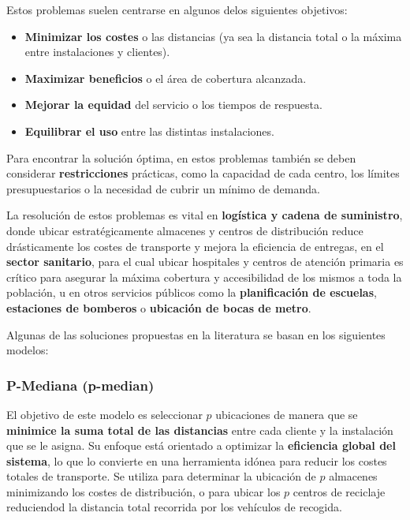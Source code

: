 \documentclass[12pt,a4paper]{book}
\begin{document}
Estos problemas suelen centrarse en algunos  delos siguientes objetivos:
\begin{itemize}
    \item \textbf{Minimizar los costes} o las distancias (ya sea la distancia total o la máxima entre instalaciones y clientes).
    \item \textbf{Maximizar beneficios} o el área de cobertura alcanzada.
    \item \textbf{Mejorar la equidad} del servicio o los tiempos de respuesta.
    \item \textbf{Equilibrar el uso} entre las distintas instalaciones.
\end{itemize}

Para encontrar la solución óptima, en estos problemas también se deben considerar \textbf{restricciones} prácticas, como la capacidad de cada centro, los límites presupuestarios o la necesidad de cubrir un mínimo de demanda.

La resolución de estos problemas es vital en \textbf{logística y cadena de suministro}, donde ubicar estratégicamente almacenes y centros
de distribución reduce drásticamente los costes de transporte y mejora la eficiencia de entregas, en el \textbf{sector sanitario}, para el cual ubicar hospitales y centros de atención primaria es crítico para
asegurar la máxima cobertura y accesibilidad de los mismos a toda la población, u en otros servicios públicos como la \textbf{planificación de escuelas}, \textbf{estaciones de bomberos} o \textbf{ubicación de bocas de metro}.

Algunas de las soluciones propuestas en la literatura se basan en los siguientes modelos:

\subsubsection{P-Mediana (p-median)}
El objetivo de este modelo es seleccionar $p$ ubicaciones de manera que se \textbf{minimice la suma total de las distancias} entre cada cliente y la instalación que se le asigna. Su enfoque está orientado a optimizar la \textbf{eficiencia global del sistema}, lo que lo convierte en una herramienta idónea para reducir los costes totales de transporte.
Se utiliza para determinar la ubicación de $p$ almacenes minimizando los costes de distribución, o para ubicar los $p$ centros de reciclaje reduciendod la distancia total recorrida por los vehículos de recogida.
\end{document}
